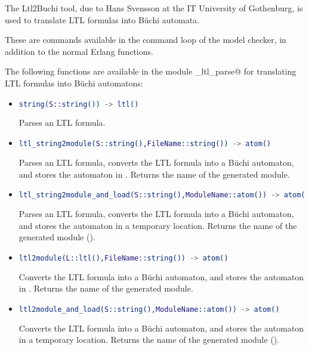 \documentclass[a4paper]{article}
\begin{document}
The Ltl2Buchi tool, due to Hans Svensson at the IT University of
Gothenburg, is used to translate LTL formulas into B\"uchi automata.

These are commands available in the
command loop of the model checker,
in addition to the normal Erlang
functions.

The following functions are available in the module
\lstinline@mce_ltl_parse@
for translating LTL formulas into B\"uchi automatons:
\begin{itemize}
\item
\begin{lstlisting}[language=Erlang]
string(S::string()) -> ltl()
\end{lstlisting}
Parses an LTL formula.
\item
\begin{lstlisting}[language=erlang]
ltl_string2module(S::string(),FileName::string()) -> atom()
\end{lstlisting}
Parses an LTL formula, converts the LTL formula into a B\"uchi automaton,
and stores the automaton in \lstinline@FileName@. Returns
the name of the generated module.
\item
\begin{lstlisting}[language=erlang]
ltl_string2module_and_load(S::string(),ModuleName::atom()) -> atom()
\end{lstlisting}
Parses an LTL formula, converts the LTL formula into a B\"uchi automaton,
and stores the automaton in a temporary location. Returns
the name of the generated module (\lstinline@ModuleName@).
\item
\begin{lstlisting}[language=erlang]
ltl2module(L::ltl(),FileName::string()) -> atom()
\end{lstlisting}
Converts the LTL formula into a B\"uchi automaton,
and stores the automaton in \lstinline@FileName@. Returns
the name of the generated module.
\item
\begin{lstlisting}[language=erlang]
ltl2module_and_load(S::string(),ModuleName::atom()) -> atom()
\end{lstlisting}
Converts the LTL formula into a B\"uchi automaton,
and stores the automaton in a temporary location. Returns
the name of the generated module (\lstinline@ModuleName@).
\end{itemize}
\end{document}
